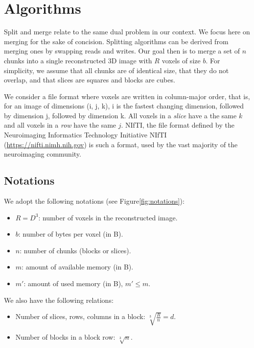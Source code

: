 \documentclass[10pt, conference, compsocconf]{IEEEtran}
\begin{document}

\section{Algorithms}
\label{sec:algos}

Split and merge relate to the same dual problem in our context. We
focus here on merging for the sake of concision. Splitting algorithms
can be derived from merging ones by swapping reads and writes. Our
goal then is to merge a set of $n$ chunks into a single reconstructed
3D image with $R$ voxels of size $b$. For simplicity, we assume that
all chunks are of identical size, that they do not overlap, and that
slices are squares and blocks are cubes.

We consider a file format where voxels are written in column-major
order, that is, for an image of dimensions (i, j, k), i is the fastest
changing dimension, followed by dimension j, followed by dimension
k. All voxels in a \emph{slice} have a the same $k$ and all voxels in
a \emph{row} have the same $j$.  NIfTI, the file format defined by the
Neuroimaging Informatics Technology Initiative
NIfTI (\url{https://nifti.nimh.nih.gov}) is such a format,
used by the vast majority of the neuroimaging community.

\subsection{Notations}

We adopt the following notations (see Figure\ref{fig:notations}):
\begin{itemize}
\item $R=D^3$: number of voxels in the reconstructed image.
\item $b$: number of bytes per voxel (in B).
\item $n$: number of chunks (blocks or slices).
\item $m$: amount of available memory (in B).
\item $m'$: amount of used memory (in B), $m'\leq m$.
\end{itemize}
We also have the following relations:
\begin{itemize}
\item Number of slices, rows, columns in a block: $\sqrt[3]{\frac{R}{n}}=d$.
\item Number of blocks in a block row: $\sqrt[3]{n}$.
\end{itemize}
\end{document}
